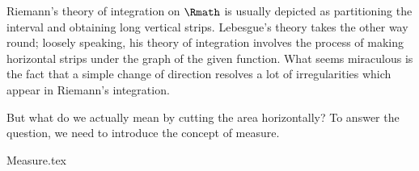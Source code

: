 \label{chap:lebesgue}

Riemann's theory of integration on \(\Rmath\) is usually depicted as
partitioning the interval and obtaining long vertical strips.
Lebesgue's theory takes the other way round;
loosely speaking, his theory of integration involves the process of
making horizontal strips under the graph of the given function.
What seems miraculous is the fact that
a simple change of direction resolves a lot of irregularities
which appear in Riemann's integration.

But what do we actually mean by cutting the area horizontally?
To answer the question, we need to introduce the concept of measure.

{Measure.tex}